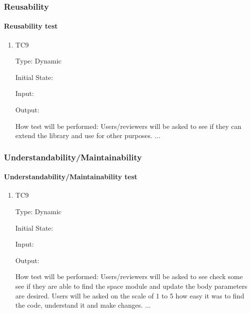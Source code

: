 \documentclass[12pt, titlepage]{article}
\begin{document}

\subsubsection{Reusability}

\paragraph{Reusability test}

\begin{enumerate}
	
\item{TC9\\}

Type: Dynamic

Initial State: 

Input: 

Output: 

How test will be performed: Users/reviewers will be asked to see if they can extend the library and use for other purposes.
...
\end{enumerate}


\subsubsection{Understandability/Maintainability}

\paragraph{Understandability/Maintainability test}

\begin{enumerate}
	
	\item{TC9\\}
	
	Type: Dynamic
	
	Initial State: 
	
	Input: 
	
	Output: 
	
	How test will be performed: Users/reviewers will be asked to see check some see if they are able to find the space module and update the body parameters are desired. Users will be asked on the scale of 1 to 5 how easy it was to find the code, understand it and make changes.
	...
\end{enumerate}
\end{document}
